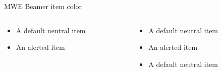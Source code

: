 \documentclass{beamer}
\begin{document}
\begin{frame}{MWE Beamer item color}
    \begin{columns}
        \begin{column}{0.5\textwidth}
                \begin{itemize}
                    \item A default neutral  item
                    \item<alert@2-> An alerted item
                \end{itemize}
        \end{column}
        \begin{column}{0.5\textwidth}
                \begin{itemize}
                    \item A default neutral  item
                    \item<alert@2-> An alerted item
                    \item A default neutral  item                    
                \end{itemize}
        \end{column}
    \end{columns}
\end{frame}
\end{document}
